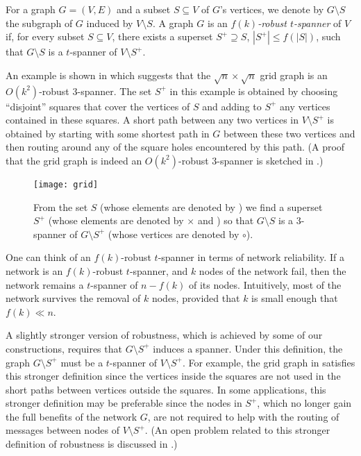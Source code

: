 \documentclass[final]{siamltex}
\begin{document}
For a graph $G=(V,E)$ and a subset $S\subseteq V$ of $G$'s vertices, we
denote by $G\setminus S$ the subgraph of $G$ induced by $V\setminus S$.
A graph $G$ is an \emph{$f(k)$-robust $t$-spanner} of $V$ if, for every
subset $S\subseteq V$, there exists a superset $S^+\supseteq S$, $|S^+|\le
f(|S|)$, such that $G\setminus S$ is a $t$-spanner of $V\setminus S^+$.

An example is shown in  which suggests that the
$\sqrt{n}\times\sqrt{n}$ grid graph is an $O(k^2)$-robust 3-spanner.
The set $S^+$ in this example is obtained by choosing ``disjoint''
squares that cover the vertices of $S$ and adding to $S^+$ any vertices
contained in these squares.  A short path between any two vertices in
$V\setminus S^+$ is obtained by starting with some shortest path in $G$
between these two vertices and then routing around any of the square
holes encountered by this path. (A proof that the grid graph is indeed
an $O(k^2)$-robust 3-spanner is sketched in .)

\begin{figure}
  \begin{center}
    \texttt{[image: grid]}
  \end{center}
  \caption{From the set $S$ (whose elements are denoted by \textbullet)
  we find a superset $S^+$ (whose elements are denoted by $\times$ and
  \textbullet) so that $G\setminus S$ is a 3-spanner of $G\setminus S^+$
  (whose vertices are denoted by $\circ$).}
\end{figure}

One can think of an $f(k)$-robust $t$-spanner in terms of network
reliability.  If a network is an $f(k)$-robust $t$-spanner, and $k$ nodes
of the network fail, then the network remains a $t$-spanner of $n-f(k)$
of its nodes.  Intuitively, most of the network survives the removal of
$k$ nodes, provided that $k$ is small enough that $f(k)\ll n$.

A slightly stronger version of robustness, which is achieved by some
of our constructions, requires that $G\setminus S^+$ induces a spanner.
Under this definition, the graph $G\setminus S^+$ must be a $t$-spanner of
$V\setminus S^+$. For example, the grid graph in  satisfies
this stronger definition since the vertices inside the squares are not
used in the short paths between vertices outside the squares.  In some
applications, this stronger definition may be preferable since the nodes
in $S^+$, which no longer gain the full benefits of the network $G$,
are not required to help with the routing of messages between nodes of
$V\setminus S^+$.  (An open problem related to this stronger definition
of robustness is discussed in .)
\end{document}
